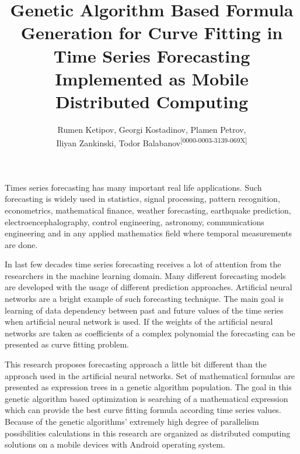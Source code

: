 \documentclass[12pt,a4paper]{article}
\title{Genetic Algorithm Based Formula Generation for Curve Fitting in Time Series Forecasting Implemented as Mobile Distributed Computing}
\author{Rumen Ketipov, Georgi Kostadinov, Plamen Petrov, \\ 
Iliyan Zankinski, Todor Balabanov\textsuperscript{[0000-0003-3139-069X]}}
\date{}
\begin{document}
\maketitle

Times series forecasting has many important real life applications. Such forecasting is widely used in statistics, signal processing, pattern recognition, econometrics, mathematical finance, weather forecasting, earthquake prediction, electroencephalography, control engineering, astronomy, communications engineering and in any applied mathematics field where temporal measurements are done. 

In last few decades time series forecasting receives a lot of attention from the researchers in the machine learning domain. Many different forecasting models are developed with the usage of different prediction approaches. Artificial neural networks are a bright example of such forecasting technique. The main goal is learning of data dependency between past and future values of the time series when artificial neural network is used. If the weights of the artificial neural networks are taken as coefficients of a complex polynomial the forecasting can be presented as curve fitting problem. 

This research proposes forecasting approach a little bit different than the approach used in the artificial neural networks. Set of mathematical formulas are presented as expression trees in a genetic algorithm population. The goal in this genetic algorithm based optimization is searching of a mathematical expression which can provide the best curve fitting formula according time series values. Because of the genetic algorithms' extremely high degree of parallelism possibilities calculations in this research are organized as distributed computing solutions on a mobile devices with Android operating system. 
\end{document}
